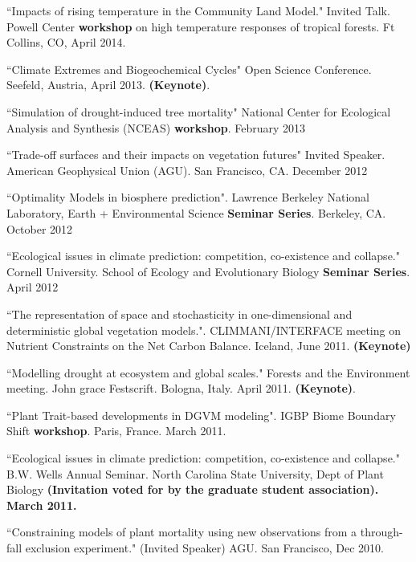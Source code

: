 \documentclass[10pt]{article}
\newenvironment{lonelist}[1][\enskip\textbullet]%
        {\vspace{-\baselineskip}\begin{list}{#1}{%
        \setlength{\itemindent}{-3pt} 
        \setlength{\partopsep}{0pt}%
        \setlength{\leftmargin}{10pt}
        \setlength{\topsep}{15pt}}}
        {\end{list}\vspace{-.3\baselineskip}}
\begin{document}
\begin{lonelist}
\begin{lonelist}
\item ``Impacts of rising temperature in the Community Land Model." Invited Talk. Powell Center \textbf{workshop} on high temperature responses of tropical forests. Ft Collins, CO,  April 2014. 


\item ``Climate Extremes and Biogeochemical Cycles" Open Science Conference.  Seefeld, Austria, April 2013. \textbf{(Keynote)}.

\item  ``Simulation of drought-induced tree mortality"  National Center for Ecological Analysis and Synthesis (NCEAS) \textbf{workshop}.  February 2013

\item  ``Trade-off surfaces and their impacts on vegetation futures" Invited Speaker. American Geophysical Union (AGU). San Francisco, CA. December 2012

\item ``Optimality Models in biosphere prediction". Lawrence Berkeley National Laboratory, Earth + Environmental Science \textbf{Seminar Series}.  Berkeley, CA.  October 2012

\item ``Ecological issues in climate prediction: competition, co-existence and collapse."  Cornell University. School of Ecology and Evolutionary Biology \textbf{Seminar Series}. April 2012 

\item ``The representation of space and stochasticity in one-dimensional and deterministic global vegetation models.". CLIMMANI/INTERFACE meeting on Nutrient Constraints on the Net Carbon Balance. Iceland, June 2011.  \textbf{(Keynote)}

\item ``Modelling drought at ecosystem and global scales." Forests and the Environment meeting. John grace Festscrift. Bologna, Italy. April 2011. \textbf{(Keynote)}.

\item ``Plant Trait-based developments in  DGVM modeling". IGBP Biome Boundary Shift \textbf{workshop}. Paris, France. March 2011. 

\item ``Ecological issues in climate prediction: competition, co-existence and collapse." B.W. Wells Annual Seminar. North Carolina State University, Dept of Plant Biology \textbf{(Invitation voted for by the graduate student association). March 2011.}

\item ``Constraining models of plant mortality using new observations from a through-fall exclusion experiment." (Invited Speaker) AGU. San Francisco, Dec 2010. 


\end{lonelist}
\end{lonelist}
\end{document}
